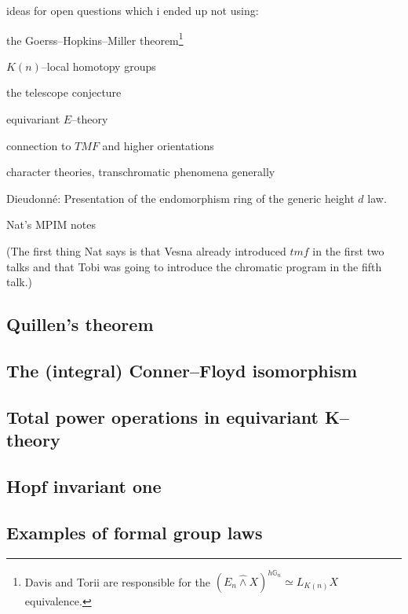 
\newpage









\oldsection*{-------------------------}




ideas for open questions which i ended up not using:


the Goerss--Hopkins--Miller theorem\footnote{Davis and Torii are responsible for the $(E_n \hat\wedge X)^{h\mathbb G_n} \simeq L_{K(n)} X$ equivalence.}

$K(n)$--local homotopy groups

the telescope conjecture

equivariant $E$--theory

connection to $TMF$ and higher orientations

character theories, transchromatic phenomena generally

Dieudonn\'e: Presentation of the endomorphism ring of the generic height $d$ law.


\newpage
\oldsection*{-----------------------------}

Nat's MPIM notes

(The first thing Nat says is that Vesna already introduced $tmf$ in the first two talks and that Tobi was going to introduce the chromatic program in the fifth talk.)

    \subsection*{Quillen's theorem}
    \subsection*{The (integral) Conner--Floyd isomorphism}
    \subsection*{Total power operations in equivariant K--theory}
    \subsection*{Hopf invariant one}

    \subsection*{Examples of formal group laws}
